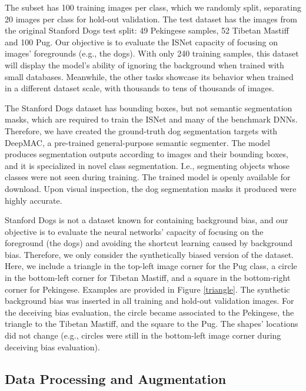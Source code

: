 \documentclass[fleqn,10pt]{wlscirep}
\begin{document}
{The subset has 100 training images per class, which we randomly split, separating 20 images per class for hold-out validation. The test dataset has the images from the original Stanford Dogs test split: 49 Pekingese samples, 52 Tibetan Mastiff and 100 Pug. Our objective is to evaluate the ISNet capacity of focusing on images' foregrounds (e.g., the dogs). With only 240 training samples, this dataset will display the model's ability of ignoring the background when trained with small databases. Meanwhile, the other tasks showcase its behavior when trained in a different dataset scale, with thousands to tens of thousands of images.

The Stanford Dogs dataset has bounding boxes, but not semantic segmentation masks, which are required to train the ISNet and many of the benchmark DNNs. Therefore, we have created the ground-truth dog segmentation targets with DeepMAC\cite{deepMAC}, a pre-trained general-purpose semantic segmenter. The model produces segmentation outputs according to images and their bounding boxes, and it is specialized in novel class segmentation. I.e., segmenting objects whose classes were not seen during training. The trained model is openly available for download\cite{deepMAC}. Upon visual inspection, the dog segmentation masks it produced were highly accurate.

Stanford Dogs is not a dataset known for containing background bias, and our objective is to evaluate the neural networks' capacity of focusing on the foreground (the dogs) and avoiding the shortcut learning caused by background bias. Therefore, we only consider the synthetically biased version of the dataset. Here, we include a triangle in the top-left image corner for the Pug class, a circle in the bottom-left corner for Tibetan Mastiff, and a square in the bottom-right corner for Pekingese. Examples are provided in Figure \ref{triangle}. The synthetic background bias was inserted in all training and hold-out validation images. For the deceiving bias evaluation, the circle became associated to the Pekingese, the triangle to the Tibetan Mastiff, and the square to the Pug. The shapes' locations did not change (e.g., circles were still in the bottom-left image corner during deceiving bias evaluation).



\subsection{Data Processing and Augmentation}
\label{ProcessingAgumentation}

}
\end{document}

